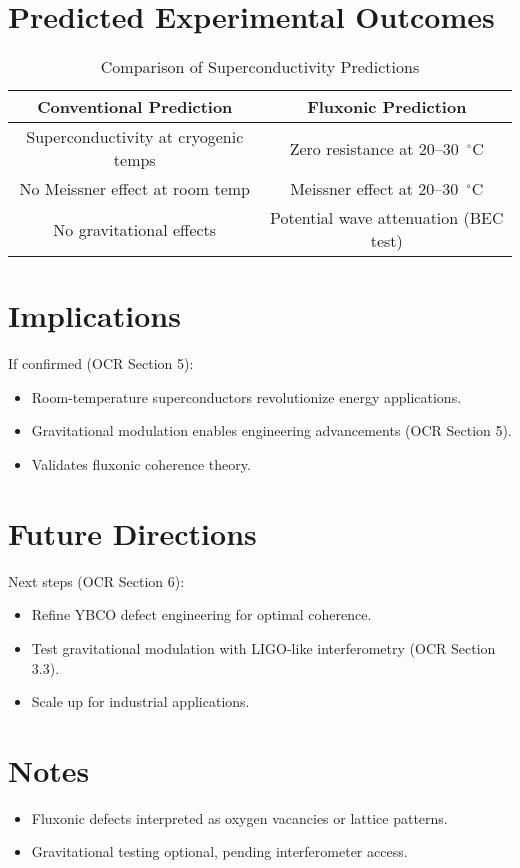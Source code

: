 \documentclass[a4paper,12pt]{article}
\begin{document}
\section{Predicted Experimental Outcomes}
\begin{table}[h]
    \centering
    \begin{tabular}{|c|c|}
        \hline
        \textbf{Conventional Prediction} & \textbf{Fluxonic Prediction} \\
        \hline
        Superconductivity at cryogenic temps & Zero resistance at 20--30~$^\circ$C \\
        No Meissner effect at room temp & Meissner effect at 20--30~$^\circ$C \\
        No gravitational effects & Potential wave attenuation (BEC test) \\
        \hline
    \end{tabular}
    \caption{Comparison of Superconductivity Predictions}
    \label{tab:predictions}
\end{table}

\section{Implications}
If confirmed (OCR Section 5):
\begin{itemize}
    \item Room-temperature superconductors revolutionize energy applications.
    \item Gravitational modulation enables engineering advancements (OCR Section 5).
    \item Validates fluxonic coherence theory.
\end{itemize}

\section{Future Directions}
Next steps (OCR Section 6):
\begin{itemize}
    \item Refine YBCO defect engineering for optimal coherence.
    \item Test gravitational modulation with LIGO-like interferometry (OCR Section 3.3).
    \item Scale up for industrial applications.
\end{itemize}

\section{Notes}
\begin{itemize}
    \item Fluxonic defects interpreted as oxygen vacancies or lattice patterns.
    \item Gravitational testing optional, pending interferometer access.
\end{itemize}
\end{document}
